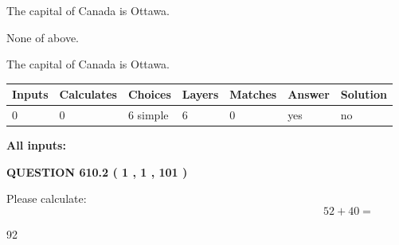 \documentclass[12pt]{article}
\begin{document}
 
The capital of Canada is Ottawa.
 
 
 None of above.
 
 
\noindent{}
 
 
The capital of Canada is Ottawa.
 
 
\noindent{}
 
 
   
   
   
   
\noindent\begin{tabular}{|l|l|l|l|l|l|l|}
 \hline
Inputs & Calculates & Choices & Layers & Matches & Answer & Solution \\ \hline
 0  & 
 0  & 
 6
  simple  
  & 
 6  & 
 0  & 
  yes & 
  no 
  \\ \hline
 \end{tabular}
   
   
   
   
\noindent{}
   
   
   
   
\noindent\vspace{0.1in}\hspace{-0.08in} {\textbf{\Large{All inputs: }}}
   
   
  
\vspace{0.2in}
  
{\textbf{\Large{QUESTION
610.2 
 ( 1 , 1 , 101 )
}}}
  
  
 
Please calculate:
\begin{equation}
52 +  %
40 = \nonumber
\end{equation}
 
 
 
\noindent{}
 
 

92
 
 
\noindent{}
 
 

 
 
 
\noindent{}
 
\end{document}
